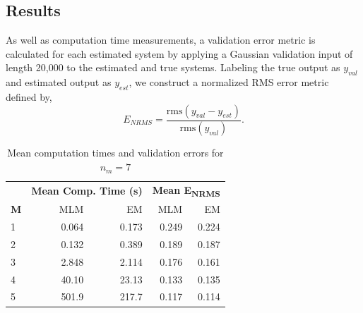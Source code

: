 \subsection{Results}

As well as computation time measurements, a validation error metric is calculated for each estimated system by applying a Gaussian validation input of length 20,000 to the estimated and true systems. Labeling the true output as $y_{val}$ and estimated output as $y_{est}$, we construct a normalized RMS error metric defined by,
\begin{equation}
E_{NRMS} = \frac{\text{rms}(y_{val}-y_{est})}{\text{rms}(y_{val})}.
\end{equation}

\renewcommand{\arraystretch}{1.3}
\begin{table}[!h]
\centering
\caption{Mean computation times and validation errors for $n_m = 7$}
\label{Results_nm7}
\begin{tabular}{l||r|r||r|r}
\hline
                & \multicolumn{2}{c||}{\textbf{Mean Comp. Time (s)}} & \multicolumn{2}{c}{\textbf{Mean E\textsubscript{NRMS}}} \\ \cline{2-5} 
\textbf{M} & \hspace{10mm} MLM          & EM            & \hspace{1mm} MLM             & EM            \\ \hline \hline 
1          & 0.064              & 0.173             & 0.249                & 0.224              \\ \hline
2          & 0.132               & 0.389             & 0.189                & 0.187              \\ \hline
3           & 2.848              & 2.114             & 0.176                & 0.161              \\ \hline
4          & 40.10               & 23.13            & 0.133                & 0.135              \\ \hline
5         & 501.9               & 217.7            & 0.117                & 0.114              \\ \hline
\end{tabular}
\end{table}

